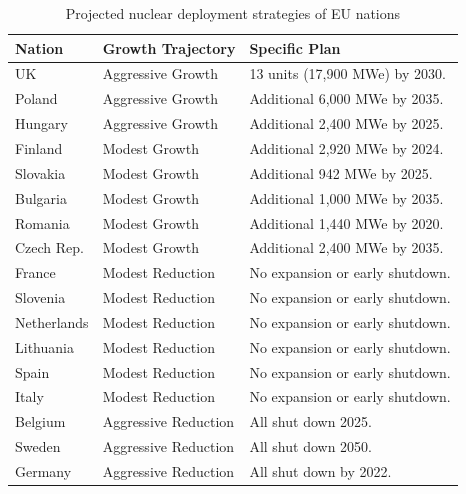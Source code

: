 \begin{table}[h]
    \centering
    \caption{Projected nuclear deployment strategies of \gls{EU} nations \cite{world_nuclear_association_nuclear_2017}}
        \begin{tabular}{lll}
            \hline 
                    \textbf{Nation} & \textbf{Growth Trajectory} & \textbf{Specific Plan }\\
                    \hline
                    UK & Aggressive Growth & {\small  13 units (17,900 \gls{MWe}) by 2030.}\\
                    Poland & Aggressive Growth &  {\small Additional 6,000 \gls{MWe} by 2035.}\\
                    Hungary & Aggressive Growth &  {\small Additional 2,400 \gls{MWe} by 2025.} \\ 
                    Finland & Modest Growth &  {\small Additional 2,920 \gls{MWe} by 2024.}\\
                    Slovakia & Modest Growth & {\small Additional 942 \gls{MWe} by 2025.}\\
                    Bulgaria & Modest Growth &  {\small Additional 1,000 \gls{MWe} by 2035.} \\
                    Romania & Modest Growth &  {\small Additional 1,440 \gls{MWe} by 2020.} \\
                    Czech Rep. & Modest Growth & {\small  Additional 2,400 \gls{MWe} by 2035.}\\
                    France & Modest Reduction & {\small No expansion or early shutdown.}\\
                    Slovenia & Modest Reduction & {\small No expansion or early shutdown.}\\
                    Netherlands & Modest Reduction & {\small No expansion or early shutdown.}\\
                    Lithuania & Modest Reduction & {\small No expansion or early shutdown.}\\
                    Spain & Modest Reduction &  {\small No expansion or early shutdown.} \\
                    Italy & Modest Reduction & {\small No expansion or early shutdown. }\\
                    Belgium & Aggressive Reduction & All shut down 2025.\\
                    Sweden & Aggressive Reduction & All shut down 2050.\\
                    Germany & Aggressive Reduction & All shut down by 2022.\\
                    \hline
                    

\end{tabular}
\end{table}
